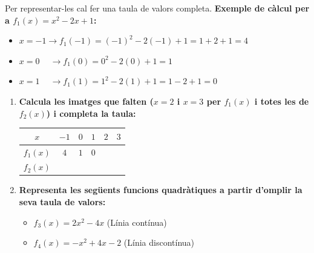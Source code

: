 \documentclass[12pt,a4paper]{article}
\begin{document}
\noindent Per representar-les cal fer una taula de valors completa. 
\textbf{Exemple de càlcul per a $f_1(x) = x^2 - 2x + 1$:}
\begin{itemize}
    \item $x = -1 \rightarrow f_1(-1) = (-1)^2 - 2(-1) + 1 = 1 + 2 + 1 = 4$
    \item $x = 0 \phantom{-} \rightarrow f_1(0) = 0^2 - 2(0) + 1 = 1$
    \item $x = 1 \phantom{-} \rightarrow f_1(1) = 1^2 - 2(1) + 1 = 1 - 2 + 1 = 0$
\end{itemize}

\begin{enumerate}[label=\textbf{\arabic*.}]
    \item \textbf{Calcula les imatges que falten ($x=2$ i $x=3$ per $f_1(x)$ i totes les de $f_2(x)$) i completa la taula:}
    
    \vspace{4cm} %
    
    \begin{center}
    \renewcommand{\arraystretch}{1.5}
    \begin{tabular}{|c|c|c|c|c|c|}
        \hline
        $x$ & $-1$ & $0$ & $1$ & $2$ & $3$ \\ \hline
        $f_1(x)$ & $4$ & $1$ & $0$ & \hspace{1cm} & \hspace{1cm} \\ \hline
        $f_2(x)$ & \hspace{1cm} & \hspace{1cm} & \hspace{1cm} & \hspace{1cm} & \hspace{1cm} \\ \hline
    \end{tabular}
    \end{center}


    \item \textbf{Representa les següents funcions quadràtiques a partir d'omplir la seva taula de valors:}
    \begin{itemize}
        \item $f_3(x) = 2x^2 - 4x$ \quad (Línia contínua)
        \item $f_4(x) = -x^2 + 4x - 2$ \quad (Línia discontínua)
    \end{itemize}

    \vspace{0.2cm}
    

\end{enumerate}
\end{document}

